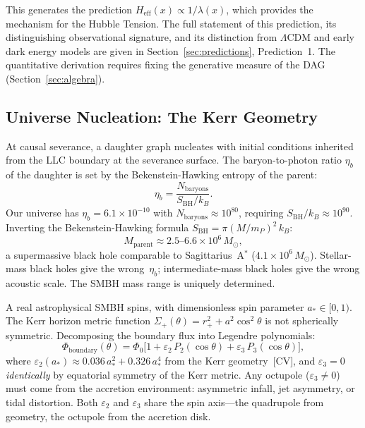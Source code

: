 \documentclass[11pt,a4paper]{article}
\theoremstyle{plain}
\theoremstyle{definition}
\theoremstyle{remark}
\begin{document}
This generates the prediction $H_{\mathrm{eff}}(x) \propto 1/\lambda(x)$, which
provides the mechanism for the Hubble Tension. The full statement of this
prediction, its distinguishing observational signature, and its distinction from
$\Lambda$CDM and early dark energy models are given in
Section~\ref{sec:predictions}, Prediction~1. The quantitative derivation requires
fixing the generative measure of the DAG (Section~\ref{sec:algebra}).

\subsection{Universe Nucleation: The Kerr Geometry}
\label{sec:kerr}

At causal severance, a daughter graph nucleates with initial conditions
inherited from the LLC boundary at the severance surface. The
baryon-to-photon ratio $\eta_b$ of the daughter is set by the
Bekenstein-Hawking entropy of the parent:
\begin{equation}
  \eta_b = \frac{N_{\mathrm{baryons}}}{S_{\mathrm{BH}}/k_B}.
  \label{eq:eta_b}
\end{equation}
Our universe has $\eta_b = 6.1 \times 10^{-10}$ with
$N_{\mathrm{baryons}} \approx 10^{80}$, requiring
$S_{\mathrm{BH}}/k_B \approx 10^{90}$. Inverting the
Bekenstein-Hawking formula $S_{\mathrm{BH}} = \pi(M/m_P)^2\,k_B$:
\begin{equation}
  M_{\mathrm{parent}} \approx 2.5\text{--}6.6 \times 10^6\,M_\odot,
  \label{eq:parent_mass}
\end{equation}
a supermassive black hole comparable to Sagittarius~A$^*$
($4.1 \times 10^6\,M_\odot$). Stellar-mass black holes give the
wrong~$\eta_b$; intermediate-mass black holes give the wrong acoustic
scale. The SMBH mass range is uniquely determined.

A real astrophysical SMBH spins, with dimensionless spin parameter
$a_* \in [0,1)$. The Kerr horizon metric function
$\Sigma_+(\theta) = r_+^2 + a^2\cos^2\theta$ is not spherically
symmetric. Decomposing the boundary flux into Legendre polynomials:
\begin{equation}
  \Phi_{\mathrm{boundary}}(\theta) = \Phi_0\bigl[1 +
  \varepsilon_2\,P_2(\cos\theta) +
  \varepsilon_3\,P_3(\cos\theta)\bigr],
  \label{eq:kerr_boundary}
\end{equation}
where $\varepsilon_2(a_*) \approx 0.036\,a_*^2 + 0.326\,a_*^4$
from the Kerr geometry~[CV], and $\varepsilon_3 = 0$
\emph{identically} by equatorial symmetry of the Kerr metric.
Any octupole ($\varepsilon_3 \neq 0$) must come from the accretion
environment: asymmetric infall, jet asymmetry, or tidal distortion.
Both $\varepsilon_2$ and $\varepsilon_3$ share the spin axis---the
quadrupole from geometry, the octupole from the accretion disk.
\end{document}
